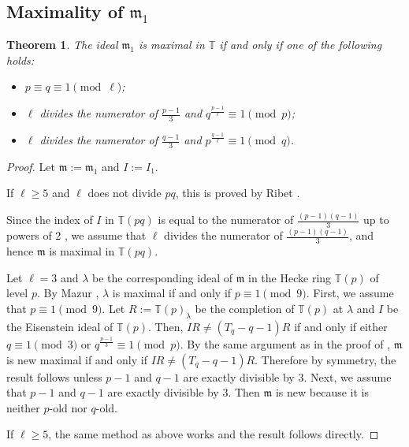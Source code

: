 \documentclass[a4paper, 12pt]{amsart}
\newtheorem{thm}{Theorem}[section]
\theoremstyle{definition}
\theoremstyle{remark}
\numberwithin{equation}{section} \numberwithin{table}{section}
\begin{document}
\subsection{Maximality of ${{\mathfrak{m}}}_1$} \label{sec:s=2}
\begin{thm}\label{thm:m1}
The ideal ${{\mathfrak{m}}}_1$ is maximal in ${{\mathbb{T}}}$ if and only if one of the following holds:
\begin{itemize}
\item $p \equiv q \equiv 1 {{ \!\pmod {\ell}}}$;
\item $\ell$ divides the numerator of $\frac{p-1}{3}$ and $q^{\frac{p-1}{\ell}}\equiv 1 \pmod p$;
\item $\ell$ divides the numerator of $\frac{q-1}{3}$ and $p^{\frac{q-1}{\ell}}\equiv 1 \pmod q$.
\end{itemize} 
\end{thm}
\begin{proof}
Let ${{\mathfrak{m}}}:={{\mathfrak{m}}}_1$ and $I:=I_1$.

If $\ell\geq 5$ and $\ell$ does not divide $pq$, this is proved by Ribet \cite[Theorem 2.4]{Yoo14a}.

Since the index of $I$ in ${{\mathbb{T}}}(pq)$ is equal to the numerator of $\frac{(p-1)(q-1)}{3}$ up to powers of 2 \cite[Theorem 5.1]{Yoo15a}, we assume that $\ell$ divides the numerator of $\frac{(p-1)(q-1)}{3}$, and hence ${{\mathfrak{m}}}$ is maximal in ${{\mathbb{T}}}(pq)$.

Let $\ell=3$ and $\lambda$ be the corresponding ideal of ${{\mathfrak{m}}}$ in the Hecke ring ${{\mathbb{T}}}(p)$ of level $p$. By Mazur \cite{M77}, $\lambda$ is maximal if and only if $p \equiv 1 \pmod 9$. 
First, we assume that $p \equiv 1 \pmod 9$. Let $R:={{\mathbb{T}}}(p)_{\lambda}$ be the completion of ${{\mathbb{T}}}(p)$ at $\lambda$ and $I$ be the Eisenstein ideal of ${{\mathbb{T}}}(p)$. 
Then, $IR\neq (T_q-q-1)R$ if and only if either $q\equiv 1 \pmod 3$ or $q^{\frac{p-1}{3}}\equiv 1 \pmod p$. By the same argument as in the proof of \cite[Theorem 2.4]{Yoo14a}, ${{\mathfrak{m}}}$ is new maximal if and only if $IR \neq (T_q-q-1)R$. Therefore by symmetry, the result follows unless $p-1$ and $q-1$ are exactly divisible by $3$. Next, we assume that $p-1$ and $q-1$ are exactly divisible by $3$. Then ${{\mathfrak{m}}}$ is new because it is neither $p$-old nor $q$-old. 

If $\ell\geq 5$, the same method as above works and the result follows directly.
\end{proof}
\end{document}
